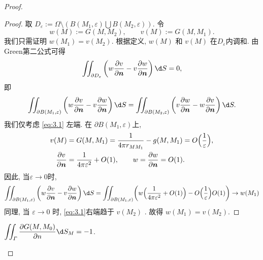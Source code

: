 \begin{proof}
  \begin{proof}
    取 $D_{\varepsilon}:=\varOmega\setminus(B(M_1,\varepsilon)\bigcup B(M_2,\varepsilon))$.
    令
    \[ w(M):=G(M,M_2), \qquad v(M):=G(M,M_1). \]
    我们只需证明 $w(M_1)=v(M_2)$.
    根据定义, $w(M)$ 和 $v(M)$ 在$D_{\varepsilon}$内调和.
    由Green第二公式可得
    \[ \iint_{\partial D_{\varepsilon}}\left(w\frac{\partial v}{\partial\bm{n}}
      -v\frac{\partial w}{\partial\bm{n}}\right)\d S = 0, \]
    即
    \begin{equation}\label{eq:3.1}
      \iint_{\partial B(M_1,\varepsilon)}
      \left(w\frac{\partial v}{\partial\bm{n}}-v\frac{\partial w}{\partial\bm{n}}\right)\d S
      = \iint_{\partial B(M_2,\varepsilon)}
        \left(v\frac{\partial w}{\partial\bm{n}}-w\frac{\partial v}{\partial\bm{n}}\right)\d S.
    \end{equation}
    我们仅考虑 \eqref{eq:3.1} 左端.
    在 $\partial B(M_1,\varepsilon)$上,
    \begin{align*}
      v(M) & = G(M,M_1) = \frac{1}{4\pi r_{MM_1}} -g(M,M_1) = O\Bigl(\frac{1}{\varepsilon}\Bigr), \\
      \frac{\partial v}{\partial\bm{n}} & = \frac{1}{4\pi\varepsilon^2} + O(1), \qquad
      w = \frac{\partial w}{\partial\bm{n}} = O(1).
    \end{align*}
    因此, 当$\varepsilon\to 0$时,
    \[ \iint_{\partial B(M_1,\varepsilon)}
      \left(w\frac{\partial v}{\partial\bm{n}}-v\frac{\partial w}{\partial\bm{n}}\right)\d S
      = \iint_{\partial B(M_1,\varepsilon)} \biggl(w\Bigl(\frac{1}{4\pi\varepsilon^2} + O(1)\Bigr)
          - O\Bigl(\frac{1}{\varepsilon}\Bigr)O(1)\biggr)
      \to w(M_1)\]
    同理, 当 $\varepsilon\to 0$ 时, \eqref{eq:3.1}右端趋于 $v(M_2)$ . 故得 $w(M_1)=v(M_2)$.
  \end{proof}

  \begin{property}
    $\displaystyle\iint_{\varGamma} \frac{\partial G(M, M_0)}{\partial n} \d S_M = -1$.

  \end{property}
  

\end{proof}
